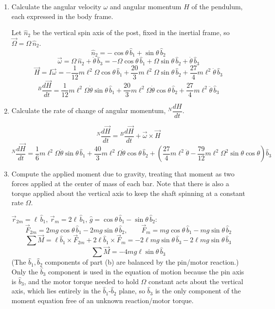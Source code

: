 \documentclass[11pt]{article}
\begin{document}
\begin{enumerate}[label=(\alph*)]
    \item Calculate the angular velocity $\omega$ and angular momentum $H$ of the pendulum, each expressed in the body frame.

    Let $\hat n_2$ be the vertical spin axis of the post, fixed in the inertial frame, so $\vec\Omega=\Omega\,\hat n_2$.
    $$\hat n_2 = -\cos\theta\,\hat b_1+\sin\theta\,\hat b_2$$
    $$\vec\omega = \Omega\,\hat n_2+\dot\theta\,\hat b_3 = -\Omega\cos\theta\,\hat b_1+\Omega\sin\theta\,\hat b_2+\dot\theta\,\hat b_3$$
    $$\boxed{\vec H = I\vec\omega = -\frac{1}{12}m\ell^2\Omega\cos\theta\,\hat b_1+\frac{20}{3}m\ell^2\Omega\sin\theta\,\hat b_2+\frac{27}{4}m\ell^2\dot\theta\,\hat b_3}$$
    $$\boxed{{}^B\frac{d\vec H}{dt} = \frac{1}{12}m\ell^2\Omega\dot\theta\sin\theta\,\hat b_1+\frac{20}{3}m\ell^2\Omega\dot\theta\cos\theta\,\hat b_2+\frac{27}{4}m\ell^2\ddot\theta\,\hat b_3}$$

    \item Calculate the rate of change of angular momentum, ${}^N\dfrac{dH}{dt}$.

    $${}^N\frac{d\vec H}{dt} = {}^B\frac{d\vec H}{dt}+\vec\omega\times\vec H$$
    $$\boxed{{}^N\frac{d\vec H}{dt} = \frac{1}{6}m\ell^2\Omega\dot\theta\sin\theta\,\hat b_1+\frac{40}{3}m\ell^2\Omega\dot\theta\cos\theta\,\hat b_2+\left(\frac{27}{4}m\ell^2\ddot\theta-\frac{79}{12}m\ell^2\Omega^2\sin\theta\cos\theta\right)\hat b_3}$$

    \item Compute the applied moment due to gravity, treating that moment as two forces applied at the center of mass of each bar. Note that there is also a torque applied about the vertical axis to keep the shaft spinning at a constant rate $\Omega$.

    $\vec r_{2m}=\ell\,\hat b_1$, $\vec r_m=2\ell\,\hat b_1$, $\hat g=\cos\theta\,\hat b_1-\sin\theta\,\hat b_2$:
    $$\vec F_{2m} = 2mg\cos\theta\,\hat b_1-2mg\sin\theta\,\hat b_2, \qquad \vec F_{m} = mg\cos\theta\,\hat b_1-mg\sin\theta\,\hat b_2$$
    $$\sum\vec M = \ell\hat b_1\times\vec F_{2m}+2\ell\hat b_1\times\vec F_m = -2\ell mg\sin\theta\,\hat b_3-2\ell mg\sin\theta\,\hat b_3$$
    $$\boxed{\sum\vec M = -4mg\ell\sin\theta\,\hat b_3}$$
    (The $\hat b_1,\hat b_2$ components of part (b) are balanced by the pin/motor reaction.) Only the $\hat b_3$ component is used in the equation of motion because the pin axis is $\hat b_3$, and the motor torque needed to hold $\Omega$ constant acts about the vertical axis, which lies entirely in the $\hat b_1$-$\hat b_2$ plane, so $\hat b_3$ is the only component of the moment equation free of an unknown reaction/motor torque.


\end{enumerate}
\end{document}
